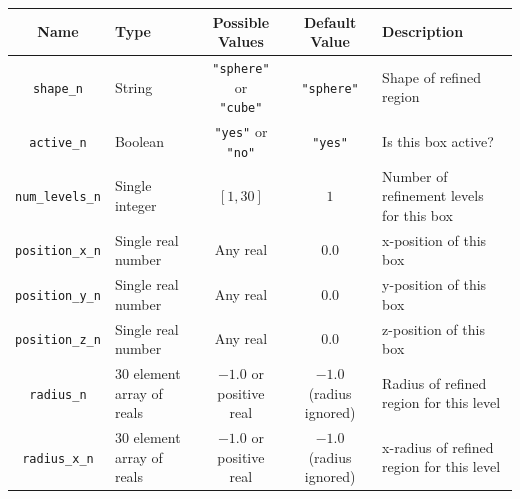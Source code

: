 \begin{table}[ht]
  \begin{tabular*}{\linewidth}{cp{7em}ccp{9em}}
    Name                    & Type                      & Possible Values                                                   & Default Value                                        & Description                               \\\hline\hline
    \texttt{shape\_n}       & String                    & \parbox[t]{6em}{\centering\texttt{"sphere"} or\\\texttt{"cube"}}  & \texttt{"sphere"}                                    & Shape of refined region                   \\
    \texttt{active\_n}      & Boolean                   & \parbox[t]{6em}{\centering\texttt{"yes"} or \texttt{"no"}}        &  \texttt{"yes"}                                      & Is this box active?                       \\
    \texttt{num\_levels\_n} & Single integer            & $[1,30]$                                                          & $1$                                                  & Number of refinement levels for this box  \\
    \texttt{position\_x\_n} & Single real number        & Any real                                                          & $0.0$                                                & x-position of this box                    \\
    \texttt{position\_y\_n} & Single real number        & Any real                                                          & $0.0$                                                & y-position of this box                    \\
    \texttt{position\_z\_n} & Single real number        & Any real                                                          & $0.0$                                                & z-position of this box                    \\
    \texttt{radius\_n}      & 30 element array of reals & \parbox[t]{6em}{\centering$-1.0$ or positive real}                & \parbox[t]{10em}{\centering$-1.0$\\(radius ignored)} & Radius of refined region for this level   \\
    \texttt{radius\_x\_n}   & 30 element array of reals & \parbox[t]{6em}{\centering$-1.0$ or positive real}                & \parbox[t]{10em}{\centering$-1.0$\\(radius ignored)} & x-radius of refined region for this level \\

\end{tabular*}
\end{table}
